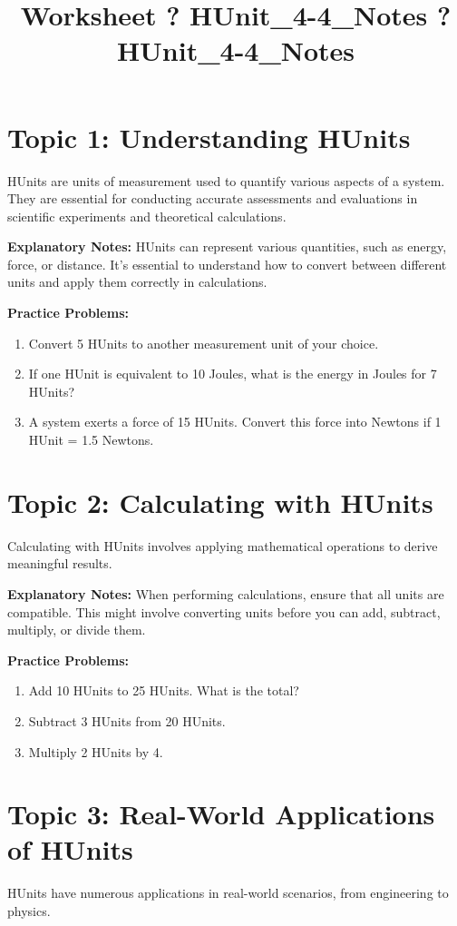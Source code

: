 \documentclass{article}
\title{Worksheet ? HUnit\_4-4\_Notes ? HUnit\_4-4\_Notes}
\author{}
\date{}
\begin{document}
\maketitle

\section*{Topic 1: Understanding HUnits}
HUnits are units of measurement used to quantify various aspects of a system. They are essential for conducting accurate assessments and evaluations in scientific experiments and theoretical calculations.

\textbf{Explanatory Notes:}
HUnits can represent various quantities, such as energy, force, or distance. It's essential to understand how to convert between different units and apply them correctly in calculations.

\textbf{Practice Problems:}
\begin{enumerate}
    \item Convert 5 HUnits to another measurement unit of your choice.
    \item If one HUnit is equivalent to 10 Joules, what is the energy in Joules for 7 HUnits?
    \item A system exerts a force of 15 HUnits. Convert this force into Newtons if 1 HUnit = 1.5 Newtons.
\end{enumerate}

\section*{Topic 2: Calculating with HUnits}
Calculating with HUnits involves applying mathematical operations to derive meaningful results. 

\textbf{Explanatory Notes:}
When performing calculations, ensure that all units are compatible. This might involve converting units before you can add, subtract, multiply, or divide them.

\textbf{Practice Problems:}
\begin{enumerate}
    \item Add 10 HUnits to 25 HUnits. What is the total?
    \item Subtract 3 HUnits from 20 HUnits.
    \item Multiply 2 HUnits by 4.
\end{enumerate}

\section*{Topic 3: Real-World Applications of HUnits}
HUnits have numerous applications in real-world scenarios, from engineering to physics.
\end{document}
